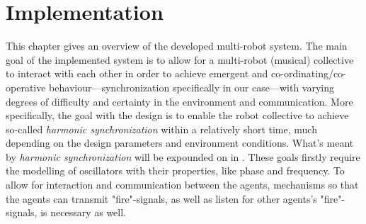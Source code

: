 \chapter{Implementation}





\newpage


This chapter gives an overview of the developed multi-robot system. The main goal of the implemented system is to allow for a multi-robot (musical) collective to interact with each other in order to achieve emergent and co-ordinating/co-operative behaviour—synchronization specifically in our case—with varying degrees of difficulty and certainty in the environment and communication. More specifically, the goal with the design is to enable the robot collective to achieve so-called \textit{harmonic synchronization} within a relatively short time, much depending on the design parameters and environment conditions. What's meant by \textit{harmonic synchronization} will be expounded on in . These goals firstly require the modelling of oscillators with their properties, like phase and frequency. To allow for interaction and communication between the agents, mechanisms so that the agents can transmit "fire"-signals, as well as listen for other agents's "fire"-signals, is necessary as well.



